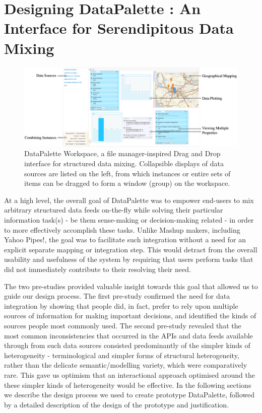 \documentclass{sigchi}
\begin{document}
\section{Designing DataPalette : An Interface for Serendipitous Data Mixing}
\begin{figure}[tbp]
\begin{center}
\includegraphics[width=18cm]{img/screenshot}

\caption{DataPalette Workspace, a file manager-inspired Drag and Drop interface for structured data mixing. Collapsible displays of data sources are listed on the left, from which instances or entire sets of items can be dragged to form a window (group) on the workspace.}

\label{fig:workspace}
\end{center}
\end{figure}

At a high level, the overall goal of DataPalette was to empower end-users to mix arbitrary structured data feeds on-the-fly while solving their particular information task(s) - be them sense-making or decision-making related - in order to more effectively accomplish these tasks.  Unlike Mashup makers, including Yahoo Pipes!, the goal was to facilitate such integration without a need for an explicit separate mapping or integration step.  This would detract from the overall usability and usefulness of the system by requiring that users perform tasks that did not immediately contribute to their resolving their need.

The two pre-studies provided valuable insight towards this goal that allowed us to guide our design process. The first pre-study confirmed the need for data integration by showing that people did, in fact, prefer to rely upon multiple sources of information for making important decisions, and identified the kinds of sources people most commonly used.  The second pre-study revealed that the most common inconsistencies that occurred in the APIs and data feeds available through from such data sources consisted predominantly of the simpler kinds of heterogeneity - terminological and simpler forms of structural heterogeneity, rather than the delicate semantic/modelling variety, which were comparatively rare. This gave us optimism that an interactional approach optimised around the these simpler kinds of heterogeneity would be effective.  In the following sections we describe the design process we used to create prototype DataPalette, followed by a detailed description of the design of the prototype and justification.
\end{document}
